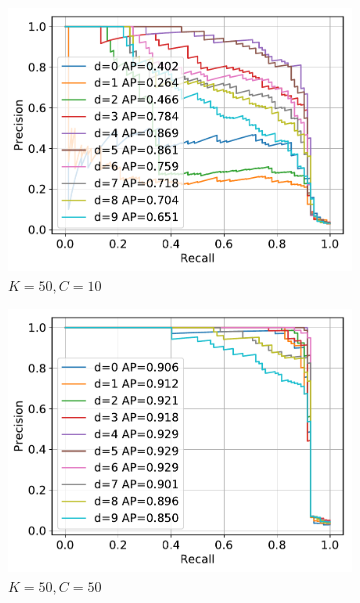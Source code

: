\documentclass[11pt,onecolumn]{article}
\begin{document}
\begin{figure}[ht!]
    \centering
    \begin{subfigure}[t]{0.24\textwidth}
        \centering
        \includegraphics[width=\linewidth]{fig/chains_lociscore_pr_k50c10d10.pdf}
        \caption{$K=50, C=10$}
    \end{subfigure}
    \hfill
    \begin{subfigure}[t]{0.24\textwidth}
        \centering
        \includegraphics[width=\linewidth]{fig/chains_lociscore_pr_k50c50d10.pdf}
        \caption{$K=50, C=50$}
    \end{subfigure}
		\hfill
    \begin{subfigure}[t]{0.24\textwidth}

\end{subfigure}
\end{figure}
\end{document}
